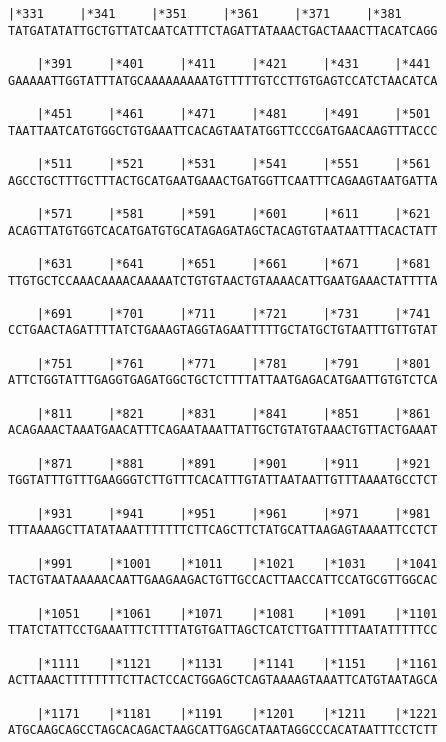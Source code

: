 \documentclass{article}
\begin{document}
\newpage
\begin{Verbatim}[fontfamily=courier]
    |*331     |*341     |*351     |*361     |*371     |*381 
TATGATATATTGCTGTTATCAATCATTTCTAGATTATAAACTGACTAAACTTACATCAGG

    |*391     |*401     |*411     |*421     |*431     |*441 
GAAAAATTGGTATTTATGCAAAAAAAAATGTTTTTGTCCTTGTGAGTCCATCTAACATCA

    |*451     |*461     |*471     |*481     |*491     |*501 
TAATTAATCATGTGGCTGTGAAATTCACAGTAATATGGTTCCCGATGAACAAGTTTACCC

    |*511     |*521     |*531     |*541     |*551     |*561 
AGCCTGCTTTGCTTTACTGCATGAATGAAACTGATGGTTCAATTTCAGAAGTAATGATTA

    |*571     |*581     |*591     |*601     |*611     |*621 
ACAGTTATGTGGTCACATGATGTGCATAGAGATAGCTACAGTGTAATAATTTACACTATT

    |*631     |*641     |*651     |*661     |*671     |*681 
TTGTGCTCCAAACAAAACAAAAATCTGTGTAACTGTAAAACATTGAATGAAACTATTTTA

    |*691     |*701     |*711     |*721     |*731     |*741 
CCTGAACTAGATTTTATCTGAAAGTAGGTAGAATTTTTGCTATGCTGTAATTTGTTGTAT

    |*751     |*761     |*771     |*781     |*791     |*801 
ATTCTGGTATTTGAGGTGAGATGGCTGCTCTTTTATTAATGAGACATGAATTGTGTCTCA

    |*811     |*821     |*831     |*841     |*851     |*861 
ACAGAAACTAAATGAACATTTCAGAATAAATTATTGCTGTATGTAAACTGTTACTGAAAT

    |*871     |*881     |*891     |*901     |*911     |*921 
TGGTATTTGTTTGAAGGGTCTTGTTTCACATTTGTATTAATAATTGTTTAAAATGCCTCT

    |*931     |*941     |*951     |*961     |*971     |*981 
TTTAAAAGCTTATATAAATTTTTTTCTTCAGCTTCTATGCATTAAGAGTAAAATTCCTCT

    |*991     |*1001    |*1011    |*1021    |*1031    |*1041
TACTGTAATAAAAACAATTGAAGAAGACTGTTGCCACTTAACCATTCCATGCGTTGGCAC

    |*1051    |*1061    |*1071    |*1081    |*1091    |*1101
TTATCTATTCCTGAAATTTCTTTTATGTGATTAGCTCATCTTGATTTTTAATATTTTTCC

    |*1111    |*1121    |*1131    |*1141    |*1151    |*1161
ACTTAAACTTTTTTTTCTTACTCCACTGGAGCTCAGTAAAAGTAAATTCATGTAATAGCA

    |*1171    |*1181    |*1191    |*1201    |*1211    |*1221
ATGCAAGCAGCCTAGCACAGACTAAGCATTGAGCATAATAGGCCCACATAATTTCCTCTT

\end{Verbatim}
\newpage
\end{document}
